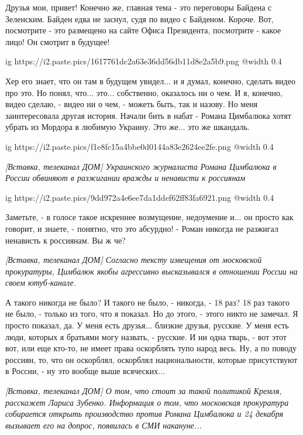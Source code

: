 \begin{multicols}{2} %
Друзья мои, привет! Конечно же, главная тема - это переговоры Байдена с
Зеленским. Байден едва не заснул, судя по видео с Байденом. Короче. Вот,
посмотрите - это размещено на сайте Офиса Президента, посмотрите - какое лицо!
Он смотрит в будущее!

\ifcmt
  ig https://i2.paste.pics/1617761dc2a63e36dd56db11d8e2a5b9.png
  @width 0.4
\fi

Хер его знает, что он там в будущем увидел... и я думал, конечно, сделать видео
про это. Но понял, что... это... собственно, оказалось ни о чем. И я, конечно,
видео сделаю, - видео ни о чем, - можеть быть, так и назову. Но меня
заинтересовала другая история. Начали бить в набат - Романа Цимбалюка хотят
убрать из Мордора в любимую Украину. Это же... это же шкандаль. 

\ifcmt
  ig https://i2.paste.pics/f1e8fc15a4bbe0d0144a83e2624ee2fe.png
  @width 0.4
\fi

{\em\color{blue}
[Вставка, телеканал ДОМ]
Украинского журналиста Романа Цимбалюка в России обвиняют в разжигании вражды и
ненависти к россиянам
}

\ifcmt
  ig https://i2.paste.pics/9dd972a4e6ee7da1ddef62ff83fa6921.png
  @width 0.4
\fi

Заметьте, - в голосе такое искреннее возмущение, недоумение и... он просто как говорит, и знаете, - 
понятно, что это абсурдно! - Роман никогда не разжигал ненависть к россиянам. Вы ж че?

{\em\color{blue}
[Вставка, телеканал ДОМ]
Согласно тексту извещения от московской прокуратуры, Цимбалюк якобы агрессивно
высказывался в отношении России на своем ютуб-канале.
}

А такого никогда не было? И такого не было, - никогда, - 18 раз? 18 раз такого
не было, - только из того, что я показал.  Но до этого, - этого никто не
замечал. Я просто показал, да. У меня есть друзья... близкие друзья, русские. У
меня есть люди, которых я братьями могу назвать, - русские. И ни одна тварь, -
вот этот вот, или еще кто-то, не имеет права оскорблять тупо народ весь. Ну, а
по поводу россиян, то, что он оскорблял, оскорблял национальности, которые
присутствуют в России, - ну это вообще выше всяческих... 

{\em\color{blue}
[Вставка, телеканал ДОМ]
О том, что стоит за такой политикой Кремля, расскажет Лариса Зубенко. Информация о том, что 
московская прокуратура собирается открыть производство против Романа Цимбалюка и 24 декабря
вызывает его на допрос, появилась в СМИ накануне...
}


\end{multicols}
